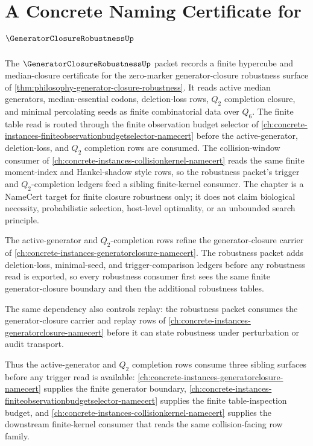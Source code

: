 \chapter{A Concrete Naming Certificate for $\GeneratorClosureRobustnessUp$}
\label{ch:concrete-instances-generator-closure-robustness-namecert}

The $\GeneratorClosureRobustnessUp$ packet records a finite hypercube and median-closure certificate for the zero-marker generator-closure robustness surface of \autoref{thm:philosophy-generator-closure-robustness}. It reads active median generators, median-essential codons, deletion-loss rows, $Q_{2}$ completion closure, and minimal percolating seeds as finite combinatorial data over $Q_{6}$. The finite table read is routed through the finite observation budget selector of \autoref{ch:concrete-instances-finiteobservationbudgetselector-namecert} before the active-generator, deletion-loss, and $Q_{2}$ completion rows are consumed. The collision-window consumer of \autoref{ch:concrete-instances-collisionkernel-namecert} reads the same finite moment-index and Hankel-shadow style rows, so the robustness packet's trigger and $Q_{2}$-completion ledgers feed a sibling finite-kernel consumer. The chapter is a NameCert target for finite closure robustness only; it does not claim biological necessity, probabilistic selection, host-level optimality, or an unbounded search principle.

The active-generator and $Q_{2}$-completion rows refine the generator-closure carrier of \autoref{ch:concrete-instances-generatorclosure-namecert}. The robustness packet adds deletion-loss, minimal-seed, and trigger-comparison ledgers before any robustness read is exported, so every robustness consumer first sees the same finite generator-closure boundary and then the additional robustness tables.

The same dependency also controls replay: the robustness packet consumes the generator-closure carrier and replay rows of \autoref{ch:concrete-instances-generatorclosure-namecert} before it can state robustness under perturbation or audit transport.

Thus the active-generator and $Q_{2}$ completion rows consume three sibling surfaces before any trigger read is available: \autoref{ch:concrete-instances-generatorclosure-namecert} supplies the finite generator boundary, \autoref{ch:concrete-instances-finiteobservationbudgetselector-namecert} supplies the finite table-inspection budget, and \autoref{ch:concrete-instances-collisionkernel-namecert} supplies the downstream finite-kernel consumer that reads the same collision-facing row family.

